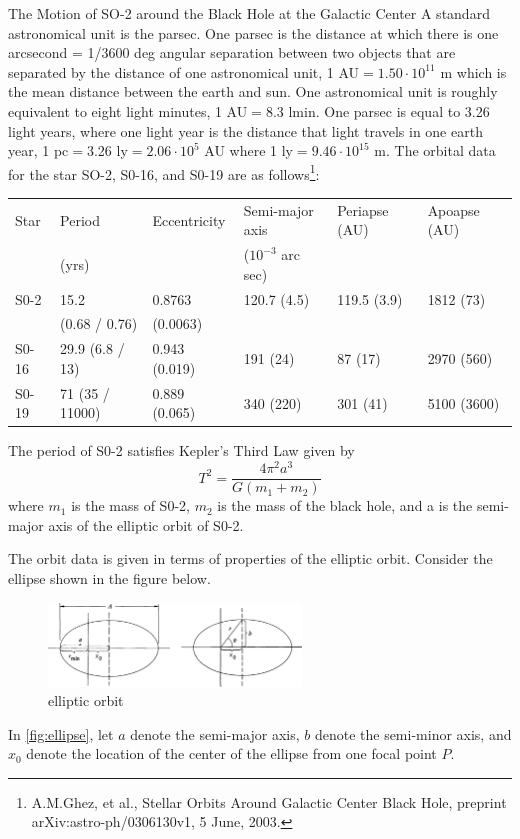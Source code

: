 \documentclass{esg8012pset}
\begin{document}
\begin{solution}
\begin{problem}{The Motion of SO-2 around the Black Hole at the Galactic Center}
    A standard astronomical unit is the parsec. One parsec is the distance at which there is one arcsecond = 1/3600 deg angular separation between two objects that are separated by the distance of one astronomical unit, 1 AU${} = 1.50 \cdot 10^{11}$ m which is the mean distance between the earth and sun. One astronomical unit is roughly equivalent to eight light minutes,  1 AU${} = 8.3$ lmin.  One parsec is equal to 3.26 light years, where one light year is the distance that light travels in one earth year, 1 pc${} = {}$3.26 ly${} = 2.06 \cdot 10^5$ AU where 1 ly${} = 9.46 \cdot 10^{15}$ m. The orbital data for the star SO-2, S0-16, and S0-19 are as follows\footnote{A.M.Ghez, et al., Stellar Orbits Around Galactic Center Black Hole, preprint arXiv:astro-ph/0306130v1, 5 June, 2003.}:
    \begin{center}
      \begin{tabular}{|l|l|l|l|l|l|}
        \hline Star  & Period          & Eccentricity  & Semi-major axis     & Periapse (AU) & Apoapse (AU) \\
                     & (yrs)           &               & ($10^{-3}$ arc sec) &               &              \\
        \hline S0-2  & 15.2            & 0.8763        & 120.7 (4.5)         & 119.5 (3.9)   & 1812 (73)    \\
                     & (0.68 / 0.76)   & (0.0063)      &                     &               &              \\
        \hline S0-16 & 29.9 (6.8 / 13) & 0.943 (0.019) & 191 (24)            & 87 (17)       & 2970 (560)   \\
        \hline S0-19 & 71 (35 / 11000) & 0.889 (0.065) & 340 (220)           & 301 (41)      & 5100 (3600)  \\ \hline
      \end{tabular}
    \end{center}
    The period of S0-2 satisfies Kepler's Third Law given by
    $$T^2 = \frac{4\pi^2 a^3}{G(m_1 + m_2)}$$
    where $m_1$ is the mass of S0-2, $m_2$ is the mass of the black hole, and a is the semi-major axis of the elliptic orbit of S0-2.

    The orbit data is given in terms of properties of the elliptic orbit. Consider the ellipse shown in the figure below.
    \begin{figure}[!h] 
      \begin{center}\includegraphics[width=0.6\textwidth]{ps10_5}\end{center}
      \caption{elliptic orbit} \label{fig:ellipse}
    \end{figure}
    In \autoref{fig:ellipse}, let $a$ denote the semi-major axis, $b$ denote the semi-minor axis, and $x_0$ denote the location of the center of the ellipse from one focal point $P$.


\end{problem}
\end{solution}
\end{document}
